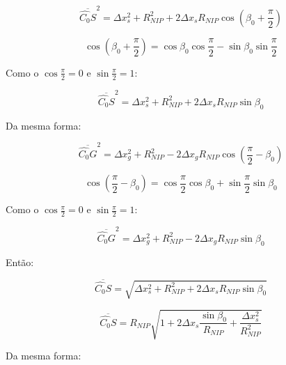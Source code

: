 \begin{equation}
 \label{eq:ap:1.10}
 \overline{\hat{C_0}S}^2 = \Delta x_{s}^2 + R_{NIP}^2 + 2 \Delta x_s R_{NIP} 
 \cos{ \left( \beta_0 + \frac{\pi}{2} \right) }
\end{equation}

\begin{equation}
 \label{eq:ap:1.11}
 \cos{\left( \beta_0 + \frac{\pi}{2} \right)} 
 = \cos{\beta_0} \cos{\frac{\pi}{2}} - \sin{\beta_0} \sin{\frac{\pi}{2}}
\end{equation}

Como o $\cos{\frac{\pi}{2}}=0$ e $\sin{\frac{\pi}{2}}=1$:

\begin{equation}
 \label{eq:ap:1.12}
 \overline{\hat{C_0}S}^2 = \Delta x_{s}^2 + R_{NIP}^2 + 2 \Delta x_s R_{NIP} \sin{\beta_0}
\end{equation}

Da mesma forma:

\begin{equation}
 \label{eq:ap:1.13}
 \overline{\hat{C_0}G}^2 = \Delta x_{g}^2 + R_{NIP}^2 - 2 \Delta x_g R_{NIP} 
 \cos{\left( \frac{\pi}{2} - \beta_0 \right) }
\end{equation}

\begin{equation}
 \label{eq:ap:1.14}
 \cos{\left( \frac{\pi}{2} - \beta_0 \right)} 
 = \cos{\frac{\pi}{2}} \cos{\beta_0} + \sin{\frac{\pi}{2}} \sin{\beta_0}
\end{equation}

Como o $\cos{\frac{\pi}{2}}=0$ e $\sin{\frac{\pi}{2}}=1$:

\begin{equation}
 \label{eq:ap:1.15}
 \overline{\hat{C_0}G}^2 = \Delta x_{g}^2 + R_{NIP}^2 - 2 \Delta x_g R_{NIP} \sin{\beta_0}
\end{equation}

Então:

\begin{equation}
 \label{eq:ap:1.16}
 \overline{\hat{C_0}S} = \sqrt{ \Delta x_{s}^2 + R_{NIP}^2 + 2 \Delta x_s R_{NIP} \sin{\beta_0} }
\end{equation}

\begin{equation}
 \label{eq:ap:1.17}
 \overline{\hat{C_0}S} = 
 R_{NIP} \sqrt{  1 + 2 \Delta x_s \frac{\sin{\beta_0}}{R_{NIP}} + \frac{\Delta x_{s}^2}{R_{NIP}^2} }
\end{equation}

Da mesma forma:

